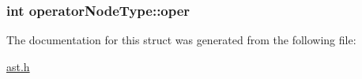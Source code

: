 \subsubsection[{\texorpdfstring{oper}{oper}}]{\setlength{\rightskip}{0pt plus 5cm}int operator\+Node\+Type\+::oper}\hypertarget{structoperatorNodeType_ae2b6d5eb95990c8356dd3dafe46f09b1}{}\label{structoperatorNodeType_ae2b6d5eb95990c8356dd3dafe46f09b1}


The documentation for this struct was generated from the following file\+:\begin{DoxyCompactItemize}
\item 
\hyperlink{ast_8h}{ast.\+h}\end{DoxyCompactItemize}
